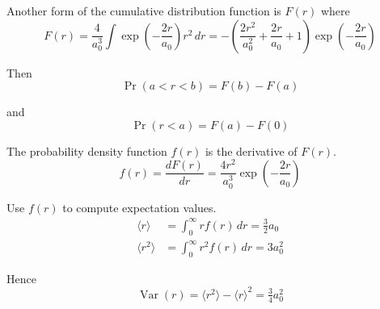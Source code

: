 \bigskip
Another form of the cumulative distribution function is $F(r)$ where
\begin{equation*}
F(r)=\frac{4}{a_0^3}
\int\exp\left(-\frac{2r}{a_0}\right)r^2\,dr
=-\left(\frac{2r^2}{a_0^2}+\frac{2r}{a_0}+1\right)
\exp\left(-\frac{2r}{a_0}\right)
\tag{2}
\end{equation*}

Then
\begin{equation*}
\Pr(a<r<b)=F(b)-F(a)
\end{equation*}

and
\begin{equation*}
\Pr(r<a)=F(a)-F(0)
\end{equation*}

The probability density function $f(r)$ is the derivative of $F(r)$.
\begin{equation*}
f(r)=\frac{dF(r)}{dr}=\frac{4r^2}{a_0^3}\exp\left(-\frac{2r}{a_0}\right)
\tag{3}
\end{equation*}

Use $f(r)$ to compute expectation values.
\begin{align*}
\langle r\rangle&=\int_0^\infty rf(r)\,dr=\tfrac{3}{2}a_0
\\
\langle r^2\rangle&=\int_0^\infty r^2f(r)\,dr=3a_0^2
\end{align*}

Hence
\begin{equation*}
\operatorname{Var}(r)=\langle r^2\rangle-\langle r\rangle^2=\tfrac{3}{4}a_0^2
\end{equation*}


